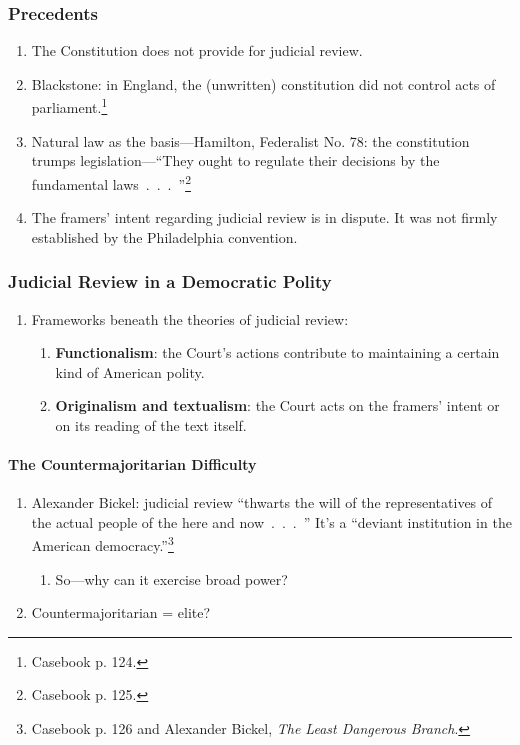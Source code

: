 \subsubsection{Precedents}

\begin{enumerate}
    \item The Constitution does not provide for judicial review.
    \item Blackstone: in England, the (unwritten) constitution did not control 
    acts of parliament.\footnote{Casebook p. 124.}
    \item Natural law as the basis---Hamilton, Federalist No. 78: the 
    constitution trumps legislation---``They ought to regulate their decisions 
    by the fundamental laws~.~.~.~''\footnote{Casebook p. 125.}
    \item The framers' intent regarding judicial review is in dispute. It was 
    not firmly established by the Philadelphia convention.
\end{enumerate}

\subsubsection{Judicial Review in a Democratic Polity}

\begin{enumerate}
    \item Frameworks beneath the theories of judicial review:
    \begin{enumerate}
        \item \textbf{Functionalism}: the Court's actions contribute to 
        maintaining a certain kind of American polity.
        \item \textbf{Originalism and textualism}: the Court acts on the framers' 
        intent or on its reading of the text itself.
    \end{enumerate}
\end{enumerate}

\paragraph{The Countermajoritarian Difficulty}

\begin{enumerate}
    \item Alexander Bickel: judicial review ``thwarts the will of the 
    representatives of the actual people of the here and now~.~.~.~'' It's a 
    ``deviant institution in the American democracy.''\footnote{Casebook p. 
    126 and Alexander Bickel, \emph{The Least Dangerous Branch}.}
    \begin{enumerate}
        \item So---why can it exercise broad power?
    \end{enumerate}
    \item Countermajoritarian = elite?
\end{enumerate}

